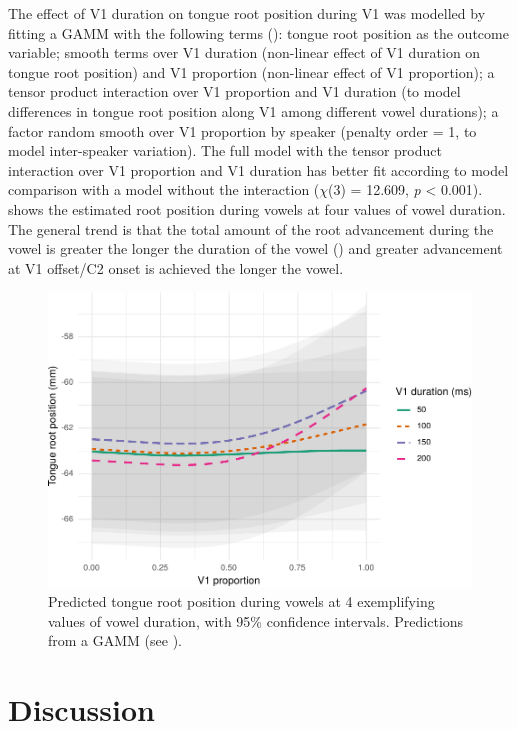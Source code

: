\documentclass[preprint]{JASAnew}
\begin{document}
\label{s:trp-v1-dur}

The effect of V1 duration on tongue root position during V1 was modelled
by fitting a GAMM with the following terms
(): tongue root position as the outcome
variable; smooth terms over V1 duration (non-linear effect of V1
duration on tongue root position) and V1 proportion (non-linear effect
of V1 proportion); a tensor product interaction over V1 proportion and
V1 duration (to model differences in tongue root position along V1 among
different vowel durations); a factor random smooth over V1 proportion by
speaker (penalty order = 1, to model inter-speaker variation). The full
model with the tensor product interaction over V1 proportion and V1
duration has better fit according to model comparison with a model
without the interaction (\(\chi\)(3) = 12.609, \emph{p} \textless{}
0.001).  shows the estimated root position during vowels
at four values of vowel duration. The general trend is that the total
amount of the root advancement during the vowel is greater the longer
the duration of the vowel () and greater advancement at
V1 offset/C2 onset is achieved the longer the vowel.

\begin{figure}
\includegraphics[width=\linewidth]{./Figure6-1} \caption{Predicted tongue root position during vowels at 4 exemplifying values of vowel duration, with 95\% confidence intervals. Predictions from a GAMM (see ).}\label{f:Figure6}
\end{figure}

\hypertarget{discussion}{%
\section{Discussion}\label{discussion}}
\end{document}
